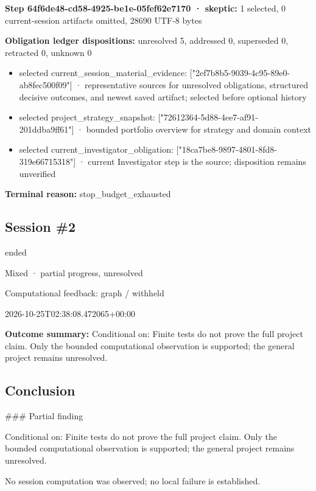 \documentclass[11pt]{article}
\begin{document}
\textbf{Step 64f6de48-cd58-4925-be1e-05fef62e7170 · skeptic:} 1 selected, 0 current-session artifacts omitted, 28690 UTF-8 bytes\par
\textbf{Obligation ledger dispositions:} unresolved 5, addressed 0, superseded 0, retracted 0, unknown 0\par
\begin{itemize}
\item selected current\_session\_material\_evidence: ["2ef7b8b5-9039-4c95-89e0-ab8fec500f09"] · representative sources for unresolved obligations, structured decisive outcomes, and newest saved artifact; selected before optional history
\item selected project\_strategy\_snapshot: ["72612364-5d88-4ee7-af91-201ddba9ff61"] · bounded portfolio overview for strategy and domain context
\item selected current\_investigator\_obligation: ["18ca7be8-9897-4801-8fd8-319e66715318"] · current Investigator step is the source; disposition remains unverified
\end{itemize}
\textbf{Terminal reason:} stop\_budget\_exhausted\par
\subsection{Session \#2}
\begin{description}[style=nextline,font=\normalfont\bfseries,leftmargin=0pt,labelsep=0pt]
\item[Execution status] ended
\item[Outcome] Mixed · partial progress, unresolved
\item[Strategy] Computational feedback: graph / withheld
\item[Started] 2026-10-25T02:38:08.472065+00:00
\end{description}
\textbf{Outcome summary:} Conditional on: Finite tests do not prove the full project claim. Only the bounded computational observation is supported; the general project remains unresolved.\par
\subsection{Conclusion}
\#\#\# Partial finding

Conditional on: Finite tests do not prove the full project claim. Only the bounded computational observation is supported; the general project remains unresolved.

No session computation was observed; no local failure is established.
\end{document}
